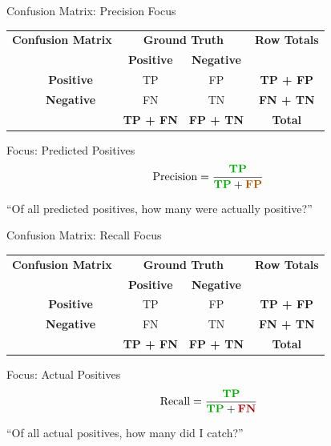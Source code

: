 \documentclass[usenames,dvipsnames]{beamer}
\begin{document}
\begin{frame}{Confusion Matrix: Precision Focus}

\begin{center}
\renewcommand{\arraystretch}{1.6}
\begin{tabular}{ccccc}
	\multicolumn{2}{c}{\textbf{Confusion Matrix}} & \multicolumn{2}{c}{\textbf{Ground Truth}} & \textbf{Row Totals} \\
	\multicolumn{2}{c}{} & \textbf{Positive} & \textbf{Negative} & \\
	\multirow{2}{*}{\rotatebox[origin=c]{90}{\textbf{Predicted}}} 
	& \textbf{Positive} & \cellcolor{green!40}TP & \cellcolor{orange!40}FP & \textbf{TP + FP} \\
	& \textbf{Negative} & FN & TN & \textbf{FN + TN} \\
	\multicolumn{2}{c}{} & \textbf{TP + FN} & \textbf{FP + TN} & \textbf{Total} \\
\end{tabular}
\end{center}

\vspace{0.4cm}
\begin{examplebox}{Focus: Predicted Positives}
$$\text{Precision} = \frac{\textcolor{green!70!black}{\textbf{TP}}}{\textcolor{green!70!black}{\textbf{TP}} + \textcolor{orange!70!black}{\textbf{FP}}}$$

``Of all predicted positives, how many were actually positive?''
\end{examplebox}

\end{frame}

\begin{frame}{Confusion Matrix: Recall Focus}

\begin{center}
\renewcommand{\arraystretch}{1.6}
\begin{tabular}{ccccc}
	\multicolumn{2}{c}{\textbf{Confusion Matrix}} & \multicolumn{2}{c}{\textbf{Ground Truth}} & \textbf{Row Totals} \\
	\multicolumn{2}{c}{} & \textbf{Positive} & \textbf{Negative} & \\
	\multirow{2}{*}{\rotatebox[origin=c]{90}{\textbf{Predicted}}} 
	& \textbf{Positive} & \cellcolor{green!40}TP & FP & \textbf{TP + FP} \\
	& \textbf{Negative} & \cellcolor{red!40}FN & TN & \textbf{FN + TN} \\
	\multicolumn{2}{c}{} & \textbf{TP + FN} & \textbf{FP + TN} & \textbf{Total} \\
\end{tabular}
\end{center}

\vspace{0.4cm}
\begin{examplebox}{Focus: Actual Positives}
$$\text{Recall} = \frac{\textcolor{green!70!black}{\textbf{TP}}}{\textcolor{green!70!black}{\textbf{TP}} + \textcolor{red!70!black}{\textbf{FN}}}$$

``Of all actual positives, how many did I catch?''
\end{examplebox}

\end{frame}
\end{document}
